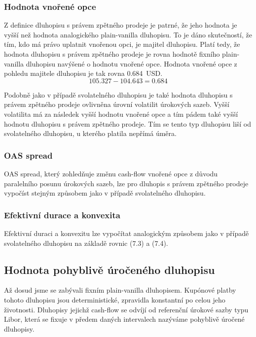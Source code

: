 \documentclass[a4paper]{book}
\begin{document}
\subsubsection{Hodnota vnořené opce}

Z definice dluhopisu s právem zpětného prodeje je patrné, že jeho hodnota je vyšší než hodnota analogického plain-vanilla dluhopisu. To je dáno skutečností, že tím, kdo má právo uplatnit vnořenou opci, je majitel dluhopisu. Platí tedy, že hodnota dluhopisu s právem zpětného prodeje je rovna hodnotě fixního plain-vanilla dluhopisu navýšené o hodnotu vnořené opce. Hodnota vnořené opce z pohledu majitele dluhopisu je tak rovna 0.684~USD.
\begin{equation*}
105.327 - 104.643 = 0.684
\end{equation*}

Podobně jako v případě svolatelného dluhopisu je také hodnota dluhopisu s právem zpětného prodeje ovlivněna úrovní volatilit úrokových sazeb. Vyšší volatilita má za následek vyšší hodnotu vnořené opce a tím pádem také vyšší hodnotu dluhopisu s právem zpětného prodeje. Tím se tento typ dluhopisu liší od svolatelného dluhopisu, u kterého platila nepřímá úměra.

\subsubsection{OAS spread}

OAS spread, který zohledňuje změnu cash-flow vnořené opce z důvodu paralelního posunu úrokových sazeb, lze pro dluhopis s právem zpětného prodeje vypočíst stejným způsobem jako v případě svolatelného dluhopisu.

\subsubsection{Efektivní durace a konvexita}

Efektivní duraci a konvexitu lze vypočítat analogickým způsobem jako v případě svolatelného dluhopisu na základě rovnic (7.3) a (7.4).

\subsection{Hodnota pohyblivě úročeného dluhopisu}

Až dosud jsme se zabývali fixním plain-vanilla dluhopisem. Kupónové platby tohoto dluhopisu jsou deterministické, zpravidla konstantní po celou jeho životnosti. Dluhopisy jejichž cash-flow se odvíjí od referenční úrokové sazby typu Libor, která se fixuje v předem daných intervalech nazýváme pohyblivě úročené dluhopisy.
\end{document}

